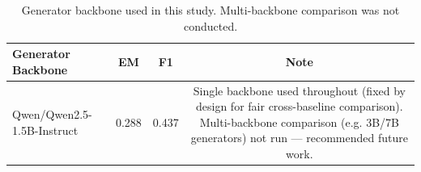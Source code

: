\begin{table}
\caption{Generator backbone used in this study. Multi-backbone comparison was not conducted.}
\label{tab:backbone_comparison}
\begin{tabular}{lccc}
\toprule
Generator Backbone & EM & F1 & Note \\
\midrule
Qwen/Qwen2.5-1.5B-Instruct & 0.288 & 0.437 & Single backbone used throughout (fixed by design for fair cross-baseline comparison). Multi-backbone comparison (e.g. 3B/7B generators) not run — recommended future work. \\
\bottomrule
\end{tabular}
\end{table}
